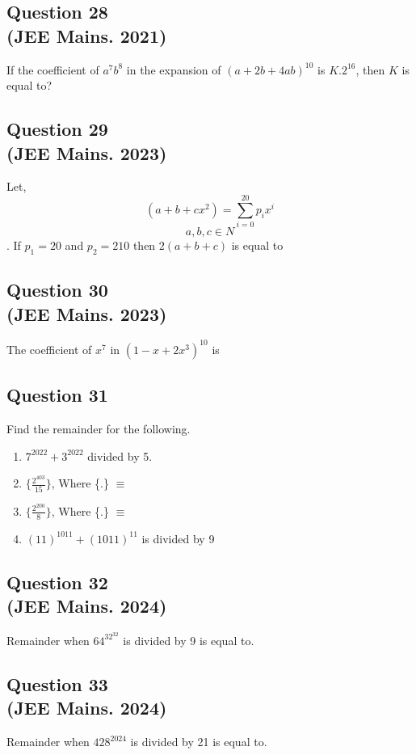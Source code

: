 \subsection*{Question 28 \\ \small(JEE Mains. 2021)}
If the coefficient of $a^7b^8$ in the expansion of $(a+2b+4ab)^{10}$ is $K.2^{16}$, then $K$ is equal to?

\subsection*{Question 29 \\ \small(JEE Mains. 2023)}
Let,
\[
(a+b+cx^2) = \sum_{i=0}^{20}p_ix^i
\]
\[
a,b,c \in N
\].
If $p_1 = 20$ and $p_2 = 210$ then $2(a+b+c)$ is equal to

\subsection*{Question 30 \\ \small(JEE Mains. 2023)}
The coefficient of $x^7$ in $(1-x+2x^3)^{10}$ is


\subsection*{Question 31}
Find the remainder for the following.
\begin{enumerate}
    \item $7^{2022}+3^{2022}$ divided by 5.
    \item $\{\frac{2^{403}}{15}\}$, Where \{.\} $\equiv$
    \item $\{\frac{2^{200}}{8}\}$, Where \{.\} $\equiv$
    \item $(11)^{1011} + (1011)^{11}$ is divided by 9
\end{enumerate}

\subsection*{Question 32 \\ \small(JEE Mains. 2024)}
Remainder when $64^{32^{32}}$ is divided by 9 is equal to.

\subsection*{Question 33 \\ \small(JEE Mains. 2024)}
Remainder when $428^{2024}$ is divided by 21 is equal to.

